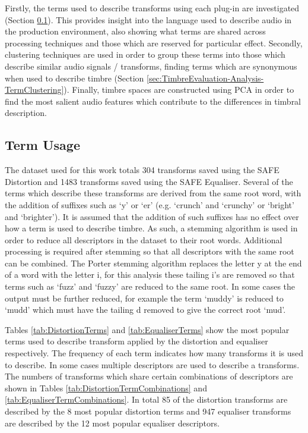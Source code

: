 	Firstly, the terms used to describe transforms using each plug-in are investigated (Section
	\ref{sec:TimbreEvaluation-Analysis-TermUsage}). This provides insight into the language used to describe audio in
	the production environment, also showing what terms are shared across processing techniques and those which are
	reserved for particular effect. Secondly, clustering techniques are used in order to group these terms into those
	which describe similar audio signals / transforms, finding terms which are synonymous when used to describe
	timbre (Section \ref{sec:TimbreEvaluation-Analysis-TermClustering}). Finally, timbre spaces are constructed using
	PCA in order to find the most salient audio features which contribute to the differences in timbral description.

	\subsection{Term Usage}
	\label{sec:TimbreEvaluation-Analysis-TermUsage}
		The dataset used for this work totals 304 transforms saved using the SAFE Distortion and 1483 transforms
		saved using the SAFE Equaliser. Several of the terms which describe these transforms are derived from the
		same root word, with the addition of suffixes such as `y' or `er' (e.g. `crunch' and `crunchy' or `bright'
		and `brighter'). It is assumed that the addition of such suffixes has no effect over how a term is used to
		describe timbre. As such, a stemming algorithm \citep{porter1980an} is used in order to reduce all
		descriptors in the dataset to their root words.  Additional processing is required after stemming so that
		all descriptors with the same root can be combined.  The Porter stemming algorithm replaces the letter y at
		the end of a word with the letter i, for this analysis these tailing i's are removed so that terms such as
		`fuzz' and `fuzzy' are reduced to the same root. In some cases the output must be further reduced, for
		example the term `muddy' is reduced to `mudd' which must have the tailing d removed to give the correct
		root `mud'.

		Tables \ref{tab:DistortionTerms} and \ref{tab:EqualiserTerms} show the most popular terms used to describe
		transform applied by the distortion and equaliser respectively. The frequency of each term indicates how
		many transforms it is used to describe. In some cases multiple descriptors are used to describe a
		transforms. The numbers of transforms which share certain combinations of descriptors are shown in Tables
		\ref{tab:DistortionTermCombinations} and \ref{tab:EqualiserTermCombinations}. In total 85 of the distortion
		transforms are described by the 8 most popular distortion terms and 947 equaliser transforms are described
		by the 12 most popular equaliser descriptors.

